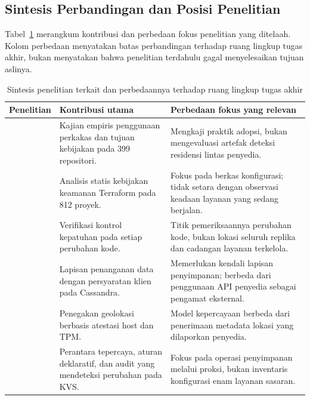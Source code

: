 \subsection{Sintesis Perbandingan dan Posisi Penelitian}
Tabel~\ref{tab:b2-literatur} merangkum kontribusi dan perbedaan fokus penelitian yang ditelaah. Kolom perbedaan menyatakan batas perbandingan terhadap ruang lingkup tugas akhir, bukan menyatakan bahwa penelitian terdahulu gagal menyelesaikan tujuan aslinya.
\begingroup
\small
\setlength{\parskip}{0pt}
\setlength{\tabcolsep}{4pt}
\begin{table}[tbp]
\centering
\caption{Sintesis penelitian terkait dan perbedaannya terhadap ruang lingkup tugas akhir}\label{tab:b2-literatur}
\begin{tabular}{@{}>{\raggedright\arraybackslash}p{}>{\raggedright\arraybackslash}p{}>{\raggedright\arraybackslash}p{}@{}}
\toprule
Penelitian & Kontribusi utama & Perbedaan fokus yang relevan \\
\midrule
\textcite{foalem2026} & Kajian empiris penggunaan perkakas dan tujuan kebijakan pada 399 repositori. & Mengkaji praktik adopsi, bukan mengevaluasi artefak deteksi residensi lintas penyedia. \\
\addlinespace
\textcite{verdet2025} & Analisis statis kebijakan keamanan Terraform pada 812 proyek. & Fokus pada berkas konfigurasi; tidak setara dengan observasi keadaan layanan yang sedang berjalan. \\
\addlinespace
\textcite{kellogg2020} & Verifikasi kontrol kepatuhan pada setiap perubahan kode. & Titik pemeriksaannya perubahan kode, bukan lokasi seluruh replika dan cadangan layanan terkelola. \\
\addlinespace
\textcite{prada2020} & Lapisan penanganan data dengan persyaratan klien pada Cassandra. & Memerlukan kendali lapisan penyimpanan; berbeda dari penggunaan API penyedia sebagai pengamat eksternal. \\
\addlinespace
\textcite{abbas2023} & Penegakan geolokasi berbasis atestasi host dan TPM. & Model kepercayaan berbeda dari penerimaan metadata lokasi yang dilaporkan penyedia. \\
\addlinespace
\textcite{gdpruler2026} & Perantara tepercaya, aturan deklaratif, dan audit yang mendeteksi perubahan pada KVS. & Fokus pada operasi penyimpanan melalui proksi, bukan inventaris konfigurasi enam layanan sasaran. \\
\bottomrule
\end{tabular}
\end{table}
\endgroup

